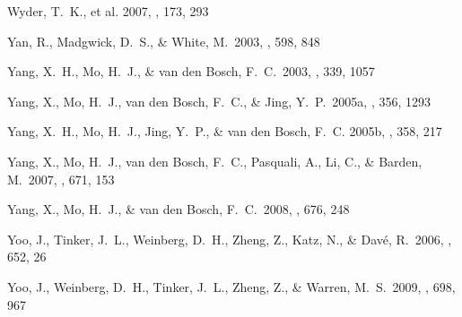 \documentclass[]{emulateapj}
\begin{document}
\begin{thebibliography}{999}
Wyder, T.\ K., et al. 2007, \apjs, 173, 293

Yan, R., Madgwick, D.\ S., \& White, M.\ 2003, \apj, 598, 848


Yang, X.\ H., Mo, H.\ J., \& van den Bosch, F.\ C.\ 2003, \mnras, 339, 1057

Yang, X., Mo, H.~J., van den Bosch, F.~C., 
\& Jing, Y.~P.\ 2005a, \mnras, 356, 1293 

Yang, X.\ H., Mo, H.\ J., Jing, Y.\ P., \& van den Bosch, F.\ C. 2005b, 
\mnras, 358, 217 %

Yang, X., Mo, H.~J., van den Bosch, F.~C., Pasquali, A., Li, C., 
\& Barden, M.\ 2007, \apj, 671, 153 

Yang, X., Mo, H.~J., \& van den Bosch, F.~C.\ 2008, \apj, 676, 248 


Yoo, J., Tinker, J.\ L., Weinberg, D.\ H., Zheng, Z., Katz, N., \& Dav{\'e}, 
R.\ 2006, \apj, 652, 26   %

Yoo, J., Weinberg, D.~H., Tinker, J.~L., Zheng, Z., 
\& Warren, M.~S.\ 2009, \apj, 698, 967 




\end{thebibliography}
\end{document}

